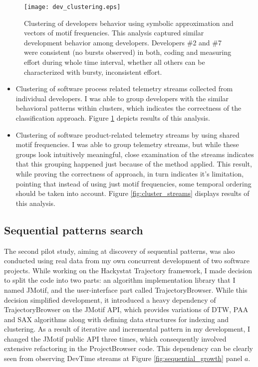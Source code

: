 \begin{figure}[tbp]
   \centering
   \texttt{[image: dev\_clustering.eps]}
   \caption{Clustering of developers behavior using symbolic approximation and vectors of motif frequencies. This analysis captured similar development behavior among developers. Developers \#2 and \#7 were consistent (no bursts observed) in both, coding and measuring effort during whole time interval, whether all others can be characterized with bursty, inconsistent effort.}
   \label{fig:cluster_developers}
\end{figure}

\begin{itemize}
	\item Clustering of software process related telemetry streams collected from individual developers. I was able to group developers with the similar behavioral patterns within clusters, which indicates the correctness of the classification approach. Figure \ref{fig:cluster_developers} depicts results of this analysis.
	\item Clustering of software product-related telemetry streams by using shared motif frequencies. I was able to group telemetry streams, but while these groups look intuitively meaningful, close examination of the streams indicates that this grouping happened just because of the method applied. This result, while proving the correctness of approach, in turn indicates it's limitation, pointing that instead of using just motif frequencies, some temporal ordering should be taken into account. Figure \ref{fig:cluster_streams} displays results of this analysis.
\end{itemize}

\subsection{Sequential patterns search}
The second pilot study, aiming at discovery of sequential patterns, was also conducted using real data from my own concurrent development of two software projects. While working on the Hackystat Trajectory framework, I made decision to split the code into two parts: an algorithm implementation library that I named JMotif, and the user-interface part called TrajectoryBrowser. While this decision simplified development, it introduced a heavy dependency of TrajectoryBrowser on the JMotif API, which provides variations of DTW, PAA and SAX algorithms along with defining data structures for indexing and clustering. As a result of iterative and incremental pattern in my development, I changed the JMotif public API three times, which consequently involved extensive refactoring in the ProjectBrowser code. This dependency can be clearly seen from observing DevTime streams at Figure \ref{fig:sequential_growth} panel $a$. 

